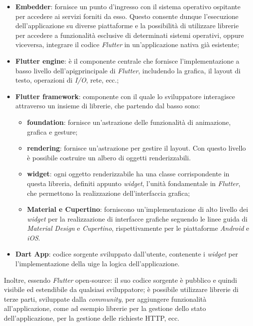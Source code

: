 \begin{itemize}
    \item \textbf{Embedder}: fornisce un punto d'ingresso con il sistema operativo ospitante per accedere ai servizi forniti da esso. Questo consente dunque l'esecuzione dell'applicazione su diverse piattaforme e la possibilità di utilizzare librerie per accedere a funzionalità esclusive di determinati sistemi operativi, oppure viceversa, integrare il codice \emph{Flutter} in un'applicazione nativa già esistente;
    \item \textbf{Flutter engine}: è il componente centrale che fornisce l'implementazione a basso livello dell'\gls{apig}\glsoccur principale di \emph{Flutter}, includendo la grafica, il layout di testo, operazioni di \emph{I/O}, rete, ecc.;
    \item \textbf{Flutter framework}: componente con il quale lo sviluppatore interagisce attraverso un insieme di librerie, che partendo dal basso sono:
    \begin{itemize}
        \item \textbf{foundation}: fornisce un'astrazione delle funzionalità di animazione, grafica e \gls{gesture}\glsoccur;
        \item \textbf{rendering}: fornisce un'astrazione per gestire il layout. Con questo livello è possibile costruire un albero di oggetti renderizzabili.
        \item \textbf{widget}: ogni oggetto renderizzabile ha una classe corrispondente in questa libreria, definiti appunto \emph{widget}, l'unità fondamentale in \emph{Flutter}, che permettono la realizzazione dell'interfaccia grafica;
        \item \textbf{Material e Cupertino}: forniscono un'implementazione di alto livello dei \emph{widget} per la realizzazione di interfacce grafiche seguendo le linee guida di \emph{Material Design} e \emph{Cupertino}, rispettivamente per le piattaforme \emph{Android} e \emph{iOS}.
    \end{itemize}
    \item \textbf{Dart App}: codice sorgente sviluppato dall'utente, contenente i \emph{widget} per l'implementazione della \gls{uig}\glsoccur e la logica dell'applicazione.
\end{itemize}

Inoltre, essendo \emph{Flutter} \gls{open-source}\glsoccur: il suo codice sorgente è pubblico e quindi visibile ed estendibile da qualsiasi sviluppatore; è possibile utilizzare librerie di terze parti, sviluppate dalla \emph{community}, per aggiungere funzionalità all'applicazione, come ad esempio librerie per la gestione dello stato dell'applicazione, per la gestione delle richieste HTTP, ecc. \\

